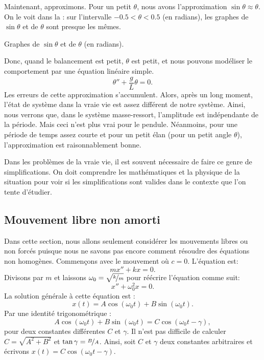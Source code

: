 Maintenant, approximons. Pour un petit $\theta$, nous avons l'approximation 
$\sin \theta \approx \theta$.  On le voit dans la :  sur l'intervalle 
$-0.5 < \theta < 0.5$ (en radians), les graphes de  $\sin \theta$ et de $\theta$ sont presque les mêmes.

\begin{mywrapfig}{3.25in}
\capstart {}
\caption{Graphes de  $\sin \theta$ et de $\theta$ (en radians).\label{mv:sinthetafig}}
\end{mywrapfig}

Donc, quand le balancement est petit,  $\theta$ est petit, et nous pouvons modéliser le comportement par une équation linéaire simple.  
\begin{equation*}
	\theta'' + \frac{g}{L} \theta = 0 .
\end{equation*}
Les erreurs de cette approximation s'accumulent. Alors, après un long moment, l'état de système dans la vraie vie est assez différent de notre système. Ainsi, nous verrons que, dans le système masse-ressort,  l'amplitude est indépendante de la période. 
Mais ceci n'est plus vrai pour le pendule.  Néanmoins, pour une période de temps assez courte et pour un petit élan (pour un petit angle $\theta$), l'approximation est raisonnablement bonne. 

Dans les problèmes de la vraie vie, il est souvent nécessaire de faire ce genre de simplifications.  On doit comprendre les mathématiques et la physique de la situation pour voir si les simplifications sont valides dans le contexte que l'on tente d'étudier. 




\subsection{Mouvement libre non amorti}

Dans cette section, nous allons seulement considérer les mouvements libres ou non forcés puisque nous ne savons pas encore comment résoudre des équations non homogènes. Commençons avec le mouvement
 où $c=0$.  L'équation est: 
\begin{equation*}
	mx'' + kx = 0 .
\end{equation*}
Divisons par $m$ et laissons $\omega_0 = \sqrt{\nicefrac{k}{m}}$ pour réécrire l'équation comme suit: 
\begin{equation*}
	x'' + \omega_0^2 x = 0 .
\end{equation*}
La solution générale à cette équation est : 
\begin{equation*}
	x(t) = A \cos (\omega_0 t) + B \sin (\omega_0 t) .
\end{equation*}
Par une identité trigonométrique : 
\begin{equation*}
	A \cos (\omega_0 t) + B \sin (\omega_0 t) =
	C \cos ( \omega_0 t - \gamma ) ,
\end{equation*}
pour deux constantes différentes $C$ et $\gamma$.
Il n'est pas difficile de calculer 
$C= \sqrt{A^2 + B^2}$ et $\tan \gamma = \nicefrac{B}{A}$.  
Ainsi, soit $C$ et $\gamma$ deux constantes arbitraires et écrivons 
$x(t) = C \cos ( \omega_0 t - \gamma )$.

